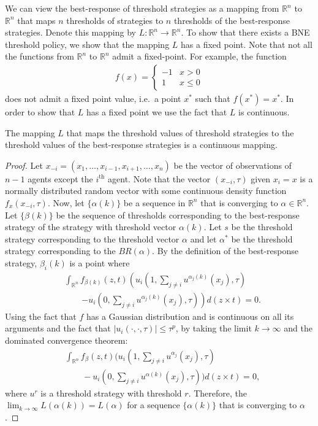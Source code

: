 \documentclass[smallextended]{svjour3}       %
\def\R{\mathbb{R}}    %
\begin{document}
We can view the best-response of threshold strategies as a mapping from $\R^n$ to $\R^n$ that maps $n$ thresholds of strategies to $n$ thresholds of the best-response strategies. Denote this mapping by $L:\R^n\to\R^n$. To show that there exists a BNE threshold policy, we show that the mapping $L$ has a fixed point. Note that not all the functions from $\R^n$ to $\R^n$ admit a fixed-point. For example, the function 
	\begin{align*}
		f(x)=\left\{\begin{array}{ll}
			-1&x>0\\
			1&x\leq 0
			\end{array}\right.
	\end{align*}
	does not admit a fixed point value, i.e.\ a point $x^*$ such that $f(x^*)=x^*$. In order to show that $L$ has a fixed point we use the fact that $L$ is continuous.
\begin{lemma}\label{lemma:continuous}
The mapping $L$ that maps the threshold values of threshold strategies to the threshold values of the best-response strategies is a continuous mapping. 
\end{lemma}


\begin{proof}
Let $x_{-i}=(x_1,\ldots,x_{i-1},x_{i+1},\ldots,x_n)$ be the vector of observations of $n-1$ agents except the $i^{\text{th}}$ agent. Note that the vector $(x_{-i},\tau)$ given $x_i=x$ is a normally distributed random vector with some continuous density function $f_{x}(x_{-i},\tau)$. Now, let $\{\alpha(k)\}$ be a sequence in $\R^n$ that is converging to $\alpha\in\R^n$. Let $\{\beta(k)\}$ be the sequence of thresholds corresponding to the best-response strategy of the strategy with threshold vector $\alpha(k)$. Let $s$ be the threshold strategy corresponding to the threshold vector $\alpha$ and let $\alpha^*$ be the threshold strategy corresponding to the $BR(\alpha)$. By the definition of the best-response strategy, $\beta_i(k)$ is a point where 
\begin{align*}
&\int_{\R^{n}}f_{\beta(k)}(z,t)\left(u_i(1,\sum_{j\not=i}u^{\alpha_j(k)}(x_j),\tau)\right.\\
&\qquad\left.-u_i(0,\sum_{j\not=i}u^{\alpha_j(k)}(x_j),\tau)\right)d(z\times t)=0.
\end{align*}
Using the fact that $f$ has a Gaussian distribution and is continuous on all its arguments and the fact that $|u_i(\cdot,\cdot,\tau)|\leq \tau^p$, by taking the limit $k\to\infty$ and the dominated convergence theorem:
\begin{align*}
&\int_{\R^{n}}f_{\beta}(z,t)(u_i(1,\sum_{j\not=i}u^{\alpha_j}(x_j),\tau)\\ 
&\qquad-u_i(0,\sum_{j\not=i}u^{\alpha(k)}(x_j),\tau))d(z\times t)=0,
\end{align*}
where $u^{r}$ is a threshold strategy with threshold $r$. Therefore, the $\lim_{k\to\infty}L(\alpha(k))=L(\alpha)$ for a sequence $\{\alpha(k)\}$ that is converging to $\alpha$.
\end{proof}
\end{document}
